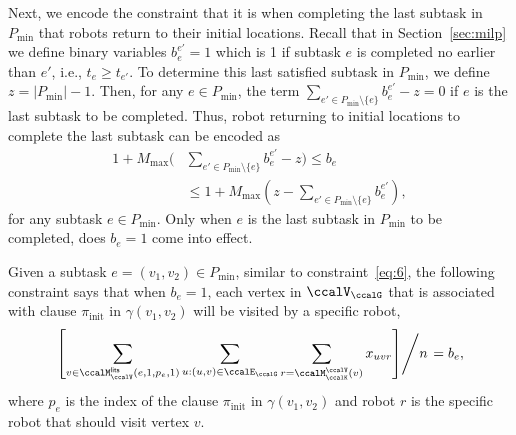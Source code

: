 \documentclass[Afour,sageh,times]{sagej}
\begin{document}
{{Next, we encode the constraint that it is when completing the last subtask in $P_{\text{min}}$ that robots return to their initial locations. Recall that in Section~\ref{sec:milp} we define binary variables $b_{e}^{e'}=1$ which is 1 if subtask $e$ is completed no earlier than $e'$, i.e., $t_e \geq t_{e'}$. To determine this last satisfied subtask in $P_{\text{min}}$, %
  we define $z = |P_{\text{min}}| -1$. Then, for any $e \in P_{\text{min}}$, the term $\sum_{e' \in  P_{\text{min}}\setminus \{e \} } b_{e}^{e'} - z  = 0$ if $e$ is the last subtask to be completed. Thus, robot returning to initial locations to complete the last subtask  can be encoded as
\begin{align}
  1 + M_{\text{max}} ( &  \sum_{e' \in  P_{\text{min}}\setminus \{e \} } b_{e}^{e'} - z)  \leq  b_e \nonumber \\
  & \leq 1 + M_{\text{max}} (z - \sum_{e' \in  P_{\text{min}}\setminus \{e \} } b_{e}^{e'}),
\end{align}
for any subtask $e \in P_{\text{min}}$. Only when $e$ is the last subtask in $P_{\text{min}}$ to be completed, does $b_e = 1$ come into effect.


Given a subtask $e = (v_1, v_2) \in P_{\text{min}}$, similar to constraint~\eqref{eq:6}, the following constraint says that when $b_e=1$, each vertex in $\ccalV_\ccalG$ that is associated with clause $\pi_{\text{init}}$ in $\gamma(v_1, v_2)$  will be visited by a specific robot,
\begin{align}\label{eq:return_suffix}
  \left.   \left[ \sum_{v \in \ccalM_\ccalV^\mathsf{lits}(e, 1, p_e, 1)}   \sum_{u: (u,v) \in \ccalE_\ccalG}     \sum_{r = \ccalM_{\ccalK}^\ccalV(v) }   x_{uvr} \right] \middle/ {n} \right. = b_e,
 \end{align}
where $p_e$ is the index of the clause $\pi_{\text{init}}$ in $\gamma(v_1, v_2)$ and robot $r$ is the specific robot that should visit vertex $v$.

}}
\end{document}

